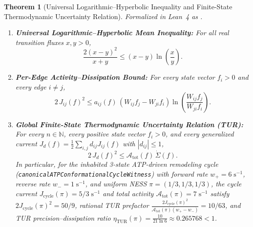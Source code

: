 \documentclass[11pt,a4paper]{article}
\newtheorem{theorem}{Theorem}[section]
\theoremstyle{definition}
\begin{document}
\begin{theorem}[Universal Logarithmic--Hyperbolic Inequality and Finite-State Thermodynamic Uncertainty Relation]
\label{thm:tur_bound}
Formalized in Lean~4 as \texttt{}.
\begin{enumerate}
  \item \textbf{Universal Logarithmic--Hyperbolic Mean Inequality:} For all real transition fluxes $x, y > 0$,
  \begin{equation}
    \frac{2(x - y)^2}{x + y} \le (x - y)\ln\!\left(\frac{x}{y}\right).
  \end{equation}
  \item \textbf{Per-Edge Activity--Dissipation Bound:} For every state vector $f_i > 0$ and every edge $i \ne j$,
  \begin{equation}
    2\,J_{ij}(f)^2 \le a_{ij}(f)\,\left(W_{ij}f_j - W_{ji}f_i\right)\ln\!\left(\frac{W_{ij}f_j}{W_{ji}f_i}\right).
  \end{equation}
  \item \textbf{Global Finite-State Thermodynamic Uncertainty Relation (TUR):} For every $n \in \mathbb{N}$, every positive state vector $f_i > 0$, and every generalized current $J_d(f) = \frac{1}{2}\sum_{i,j} d_{ij} J_{ij}(f)$ with $|d_{ij}| \le 1$,
  \begin{equation}
    2\,J_d(f)^2 \le \mathcal{A}_{\mathrm{tot}}(f)\,\dot{\Sigma}(f).
  \end{equation}
  In particular, for the inhabited 3-state ATP-driven remodeling cycle (\texttt{canonicalATPConformationalCycleWitness}) with forward rate $w_+ = 6\;\mathrm{s}^{-1}$, reverse rate $w_- = 1\;\mathrm{s}^{-1}$, and uniform NESS $\pi = (1/3, 1/3, 1/3)$, the cycle current $J_{\mathrm{cycle}}(\pi) = 5/3\;\mathrm{s}^{-1}$ and total activity $\mathcal{A}_{\mathrm{tot}}(\pi) = 7\;\mathrm{s}^{-1}$ satisfy $2 J_{\mathrm{cycle}}(\pi)^2 = 50/9$, rational TUR prefactor $\frac{2 J_{\mathrm{cycle}}(\pi)^2}{\mathcal{A}_{\mathrm{tot}}(\pi)(w_+ - w_-)} = 10/63$, and TUR precision--dissipation ratio $\eta_{\mathrm{TUR}}(\pi) = \frac{10}{21\ln 6} \approx 0.265768 < 1$.
\end{enumerate}
\end{theorem}
\end{document}
